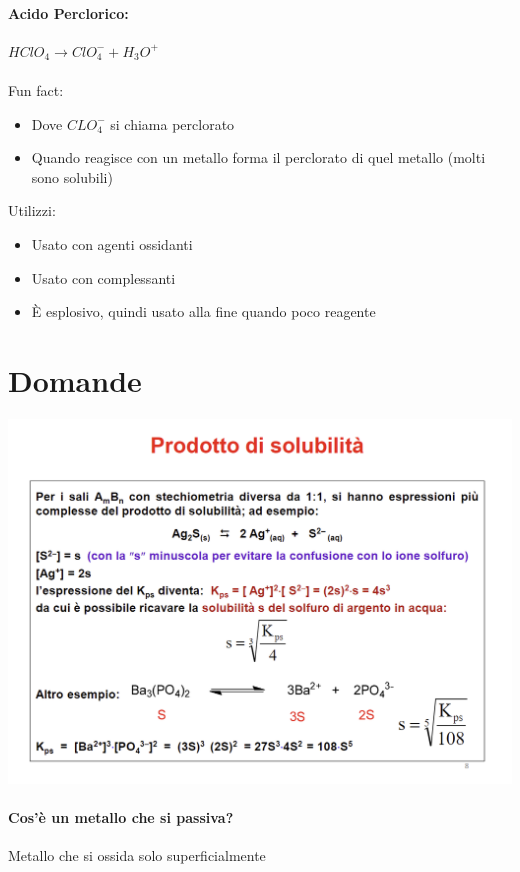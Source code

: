 \documentclass{article}
\begin{document}
\paragraph{Acido Perclorico: } $HClO_4 \rightarrow ClO_4^- + H_3O^+$
\\\\
Fun fact:
\begin{itemize}
	\item Dove $CLO_4^-$ si chiama perclorato
	\item Quando reagisce con un metallo forma il perclorato di quel metallo (molti sono solubili)
\end{itemize}
%
Utilizzi:
\begin{itemize}
	\item Usato con agenti ossidanti
	\item Usato con complessanti
	\item È esplosivo, quindi usato alla fine quando poco reagente
\end{itemize}


\newpage
\section{Domande}
\begin{center}
	\includegraphics*[width=0.9\linewidth]{../images/wtf1.png}
\end{center}

\hrulefill

\paragraph{Cos'è un metallo che si passiva?} Metallo che si ossida solo superficialmente
\end{document}
